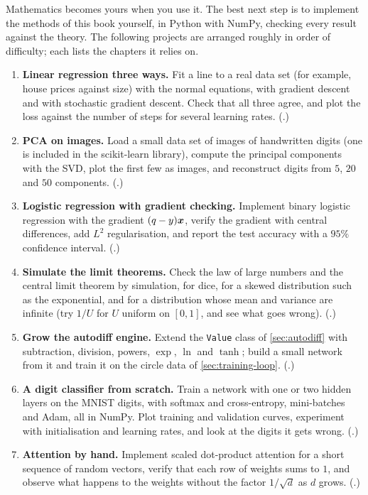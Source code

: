 Mathematics becomes yours when you use it. The best next step is to implement
the methods of this book yourself, in Python with NumPy, checking every result
against the theory. The following projects are arranged roughly in order of
difficulty; each lists the chapters it relies on.

\begin{enumerate}[label=\textbf{Project \arabic*.},leftmargin=*,itemsep=5pt]
  \item \textbf{Linear regression three ways.} Fit a line to a real data set (for
    example, house prices against size) with the normal equations, with gradient
    descent and with stochastic gradient descent. Check that all three agree, and
    plot the loss against the number of steps for several learning rates.
    (.)
  \item \textbf{PCA on images.} Load a small data set of images of handwritten
    digits (one is included in the scikit-learn library), compute the principal
    components with the SVD, plot the first few as images, and reconstruct digits
    from $5$, $20$ and $50$ components. (.)
  \item \textbf{Logistic regression with gradient checking.} Implement binary
    logistic regression with the gradient $(q - y)\bm{x}$, verify the gradient with
    central differences, add $L^2$ regularisation, and report the test accuracy
    with a $95\%$ confidence interval. (.)
  \item \textbf{Simulate the limit theorems.} Check the law of large numbers and
    the central limit theorem by simulation, for dice, for a skewed distribution
    such as the exponential, and for a distribution whose mean and variance are
    infinite (try $1/U$ for $U$ uniform on $[0, 1]$, and see what goes wrong). (.)
  \item \textbf{Grow the autodiff engine.} Extend the \texttt{Value} class of
    \cref{sec:autodiff} with subtraction, division, powers, $\exp$, $\ln$ and
    $\tanh$; build a small network from it and train it on the circle data of
    \cref{sec:training-loop}. (.)
  \item \textbf{A digit classifier from scratch.} Train a network with one or two
    hidden layers on the MNIST digits, with softmax and cross-entropy, mini-batches
    and Adam, all in NumPy. Plot training and validation curves, experiment with
    initialisation and learning rates, and look at the digits it gets wrong.
    (.)
  \item \textbf{Attention by hand.} Implement scaled dot-product attention for a
    short sequence of random vectors, verify that each row of weights sums to $1$,
    and observe what happens to the weights without the factor $1/\sqrt d$ as $d$
    grows. (.)
\end{enumerate}

